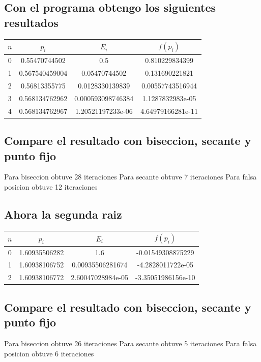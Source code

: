 \documentclass{article}
\begin{document}
\subsection{Con el programa obtengo los siguientes resultados}

\begin{center}
    \begin{tabular}{||c c c c||} 
    \hline
    $n$ & $p_{i}$ & $E_i$  & $ f(p_i)$ \\ [0.5ex] 
    \hline
    0 & 0.55470744502 & 0.5 & 0.810229834399 \\
    \hline
    1 & 0.567540459004 & 0.05470744502 & 0.131690221821 \\
    \hline
    2 & 0.56813355775 & 0.0128330139839 & 0.00557743516944 \\
    \hline
    3 & 0.568134762962 & 0.000593098746384 & 1.1287832983e-05 \\ 
    \hline
    4 & 0.568134762967 & 1.20521197233e-06 &  4.64979166281e-11 \\ [1ex]

   \end{tabular}
\end{center}

\subsection{Compare el resultado con biseccion, secante y punto fijo}
Para biseccion obtuve 28 iteraciones
Para secante obtuve 7 iteraciones
Para falsa posicion obtuve 12 iteraciones

\subsection{Ahora la segunda raiz}

\begin{center}
    \begin{tabular}{||c c c c||} 
    \hline
    $n$ & $p_{i}$ & $E_i$  & $ f(p_i)$ \\ [0.5ex] 
    \hline
    0 & 1.60935506282 & 1.6 & -0.01549308875229 \\
    \hline
    1 & 1.60938106752 & 0.00935506281674 & -4.2828011722e-05 \\
    \hline
    2 & 1.60938106772 & 2.60047028984e-05 & -3.35051986156e-10 \\ [1ex]
    \hline
   \end{tabular}
\end{center}

\subsection{Compare el resultado con biseccion, secante y punto fijo}
Para biseccion obtuve 26 iteraciones
Para secante obtuve 5 iteraciones
Para falsa posicion obtuve 6 iteraciones
\end{document}
